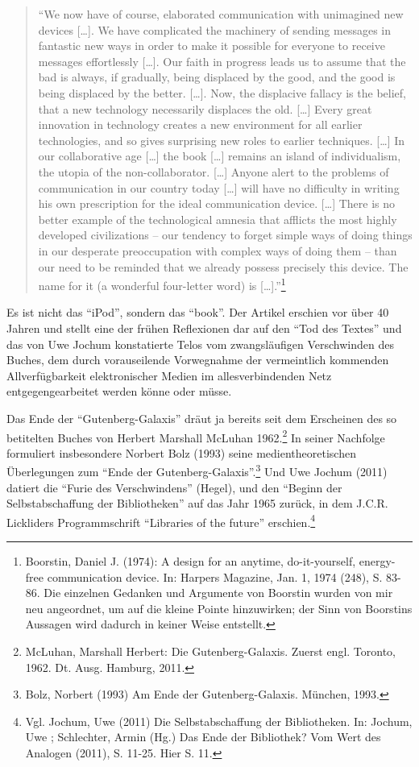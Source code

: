 \documentclass[a4paper,
fontsize=11pt,
oneside,
numbers=noperiodatend,
parskip=half-,
bibliography=totoc,
final
]{scrartcl}
\begin{document}
\begin{quote}
\enquote{We now have of course, elaborated communication with unimagined
new devices {[}\ldots{}{]}. We have complicated the machinery of sending
messages in fantastic new ways in order to make it possible for everyone
to receive messages effortlessly {[}\ldots{}{]}. Our faith in progress
leads us to assume that the bad is always, if gradually, being displaced
by the good, and the good is being displaced by the better.
{[}\ldots{}{]}. Now, the displacive fallacy is the belief, that a new
technology necessarily displaces the old. {[}\ldots{}{]} Every great
innovation in technology creates a new environment for all earlier
technologies, and so gives surprising new roles to earlier techniques.
{[}\ldots{}{]} In our collaborative age {[}\ldots{}{]} the book
{[}\ldots{}{]} remains an island of individualism, the utopia of the
non-collaborator. {[}\ldots{}{]} Anyone alert to the problems of
communication in our country today {[}\ldots{}{]} will have no
difficulty in writing his own prescription for the ideal communication
device. {[}\ldots{}{]} There is no better example of the technological
amnesia that afflicts the most highly developed civilizations -- our
tendency to forget simple ways of doing things in our desperate
preoccupation with complex ways of doing them -- than our need to be
reminded that we already possess precisely this device. The name for it
(a wonderful four-letter word) is {[}\ldots{}{]}.}\footnote{Boorstin,
  Daniel J. (1974): A design for an anytime, do-it-yourself, energy-free
  communication device. In: Harpers Magazine, Jan. 1, 1974 (248), S.
  83-86. Die einzelnen Gedanken und Argumente von Boorstin wurden von
  mir neu angeordnet, um auf die kleine Pointe hinzuwirken; der Sinn von
  Boorstins Aussagen wird dadurch in keiner Weise entstellt.}
\end{quote}

Es ist nicht das \enquote{iPod}, sondern das \enquote{book}. Der Artikel
erschien vor über 40 Jahren und stellt eine der frühen Reflexionen dar
auf den \enquote{Tod des Textes} und das von Uwe Jochum konstatierte
Telos vom zwangsläufigen Verschwinden des Buches, dem durch
vorauseilende Vorwegnahme der vermeintlich kommenden Allverfügbarkeit
elektronischer Medien im allesverbindenden Netz entgegengearbeitet
werden könne oder müsse.

Das Ende der \enquote{Gutenberg-Galaxis} dräut ja bereits seit dem
Erscheinen des so betitelten Buches von Herbert Marshall McLuhan
1962.\footnote{McLuhan, Marshall Herbert: Die Gutenberg-Galaxis. Zuerst
  engl. Toronto, 1962. Dt. Ausg. Hamburg, 2011.} In seiner Nachfolge
formuliert insbesondere Norbert Bolz (1993) seine medientheoretischen
Überlegungen zum \enquote{Ende der Gutenberg-Galaxis}.\footnote{Bolz,
  Norbert (1993) Am Ende der Gutenberg-Galaxis. München, 1993.} Und Uwe
Jochum (2011) datiert die \enquote{Furie des Verschwindens} (Hegel), und
den \enquote{Beginn der Selbstabschaffung der Bibliotheken} auf das Jahr
1965 zurück, in dem J.C.R. Lickliders Programmschrift \enquote{Libraries
of the future} erschien.\footnote{Vgl. Jochum, Uwe (2011) Die
  Selbstabschaffung der Bibliotheken. In: Jochum, Uwe ; Schlechter,
  Armin (Hg.) Das Ende der Bibliothek? Vom Wert des Analogen (2011), S.
  11-25. Hier S. 11.}
\end{document}
